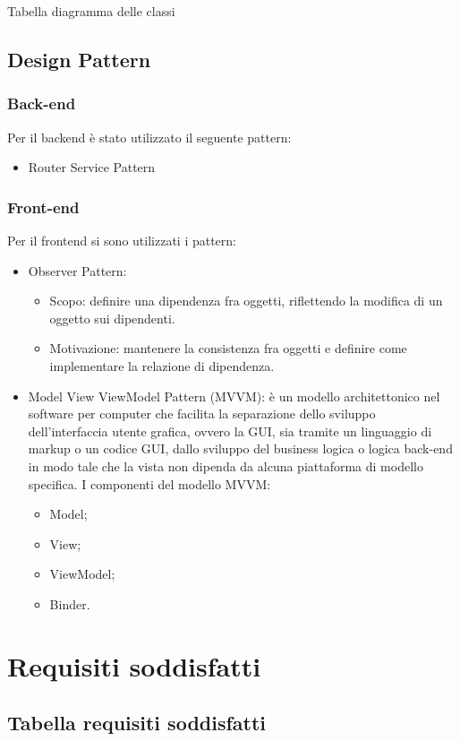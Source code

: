 \documentclass[12pt]{article}
\begin{document}
Tabella diagramma delle classi

\subsection{Design Pattern}
\subsubsection{Back-end}
Per il backend è stato utilizzato il seguente pattern:
	\begin{itemize}
		\item Router Service Pattern
	\end{itemize}
\subsubsection{Front-end}
Per il frontend si sono utilizzati i pattern:
\begin{itemize}
	\item Observer Pattern:
	\begin{itemize}
		\item Scopo: definire una dipendenza fra oggetti, riflettendo la modifica di un oggetto sui dipendenti.
		\item Motivazione: mantenere la consistenza fra oggetti e definire come implementare la relazione di dipendenza.
	\end{itemize}
	\item Model View ViewModel Pattern (MVVM): è un modello architettonico nel software per computer che facilita la separazione dello sviluppo dell'interfaccia utente grafica, ovvero la GUI,
sia tramite un linguaggio di markup o un codice GUI, dallo sviluppo del business logica o logica back-end in modo tale che la vista non dipenda da alcuna piattaforma di modello specifica.
I componenti del modello MVVM:	
	\begin{itemize}
		\item Model;
		\item View;
		\item ViewModel;
		\item Binder.
	\end{itemize}
\end{itemize}
\section{Requisiti soddisfatti}
\subsection{Tabella requisiti soddisfatti}
\end{document}

